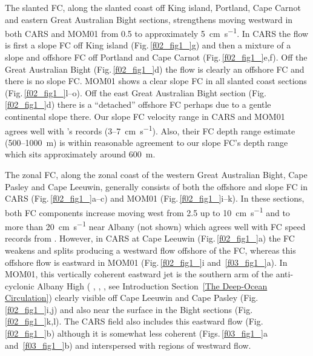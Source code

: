 \documentclass[preprint,3p,review,12pt]{elsarticle}
\newcommand{\citepos}[1]{\citeauthor{#1}'s \citeyearpar{#1}}
\begin{document}
The slanted FC, along the slanted coast off King island, Portland, Cape Carnot and eastern Great Australian Bight sections, strengthens moving westward in both CARS and MOM01 from \num{0.5} to approximately \SI{5}{\centi\meter\per\second}. In CARS the flow is first a slope FC off King island (Fig.\,\ref{f02_fig1_}g) and then a mixture of a slope and offshore FC off Portland and Cape Carnot (Fig.\,\ref{f02_fig1_}e,f). Off the Great Australian Bight (Fig.\,\ref{f02_fig1_}d) the flow is clearly an offshore FC and there is no slope FC\@.
MOM01 shows a clear slope FC in all slanted coast sections (Fig.\,\ref{f02_fig1_}l--o).
Off the east Great Australian Bight section (Fig.\,\ref{f02_fig1_}d) there is a ``detached'' offshore FC perhaps due to a gentle continental slope there.
Our slope FC velocity range in CARS and MOM01 agrees well with \citepos{Middleton2007} records (\num{3}--\SI{7}{\centi\meter\per\second}). Also, their FC depth range estimate (\num{500}--\SI{1000}{\meter}) is within reasonable agreement to our slope FC's depth range which sits approximately around \SI{600}{\meter}.

The zonal FC, along the zonal coast of the western Great Australian Bight, Cape Pasley and Cape Leeuwin, generally consists of both the offshore and slope FC in CARS (Fig.\,\ref{f02_fig1_}a--c) and MOM01 (Fig.\,\ref{f02_fig1_}i--k). In these sections, both FC components increase moving west from \num{2.5} up to \SI{10}{\centi\meter\per\second} and to more than \SI{20}{\centi\meter\per\second} near Albany (not shown) which agrees well with FC speed records from \citet{Cresswell1993}. However, in CARS at Cape Leeuwin (Fig.\,\ref{f02_fig1_}a) the FC weakens and splits producing a westward flow offshore of the FC, whereas this offshore flow is eastward in MOM01 (Fig.\,\ref{f02_fig1_}i and~\ref{f03_fig1_}a).
In MOM01, this vertically coherent eastward jet is the southern arm of the anti-cyclonic Albany High (\citeauthor{Middleton2003} \citeyear{Middleton2003}, \citeauthor{Middleton2007} \citeyear{Middleton2007}, \citeauthor{McCartney2007} \citeyear{McCartney2007}, see Introduction Section~\ref{The Deep-Ocean Circulation}) clearly visible off Cape Leeuwin and Cape Pasley (Fig.\,\ref{f02_fig1_}i,j) and also near the surface in the Bight sections (Fig.\,\ref{f02_fig1_}k,l).
The CARS field also includes this eastward flow (Fig.\,\ref{f02_fig1_}b) although it is somewhat less coherent (Figs.\,\ref{f03_fig1_}a and~\ref{f03_fig1_}b) and interspersed with regions of westward flow.
\end{document}
